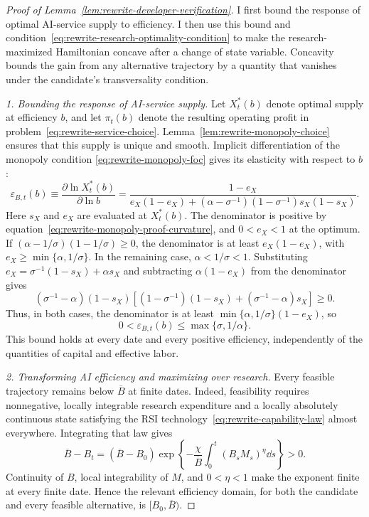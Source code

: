 \begin{proof}[Proof of Lemma~\ref{lem:rewrite-developer-verification}]
I first bound the response of optimal AI-service supply to efficiency.
I then use this bound and
condition~\eqref{eq:rewrite-research-optimality-condition} to make the
research-maximized Hamiltonian concave after a change of state variable.
Concavity bounds the gain from any alternative trajectory by a quantity
that vanishes under the candidate's transversality condition.

\emph{1. Bounding the response of AI-service supply.}
Let $X_t^*(b)$ denote optimal supply at efficiency $b$, and let
$\pi_t(b)$ denote the resulting operating profit in
problem~\eqref{eq:rewrite-service-choice}.
Lemma~\ref{lem:rewrite-monopoly-choice} ensures that this supply is unique
and smooth. Implicit differentiation of the monopoly condition
\eqref{eq:rewrite-monopoly-foc} gives its elasticity with respect to $b$:
\begin{equation}
 \varepsilon_{B,t}(b)\equiv
 \frac{\partial\ln X_t^*(b)}{\partial\ln b}
 =\frac{1-e_X}{e_X(1-e_X)
 +(\alpha-\sigma^{-1})(1-\sigma^{-1})s_X(1-s_X)}.
 \label{eq:rewrite-service-capability-elasticity}
\end{equation}
Here $s_X$ and $e_X$ are evaluated at $X_t^*(b)$.
The denominator is positive by
equation~\eqref{eq:rewrite-monopoly-proof-curvature}, and $0<e_X<1$ at
the optimum. If $(\alpha-1/\sigma)(1-1/\sigma)\geq0$, the denominator
is at least $e_X(1-e_X)$, with
$e_X\geq\min\{\alpha,1/\sigma\}$.
In the remaining case, $\alpha<1/\sigma<1$. Substituting
$e_X=\sigma^{-1}(1-s_X)+\alpha s_X$ and subtracting
$\alpha(1-e_X)$ from the denominator gives
\[
 (\sigma^{-1}-\alpha)(1-s_X)
 \left[(1-\sigma^{-1})(1-s_X)+(\sigma^{-1}-\alpha)s_X\right]\geq0.
\]
Thus, in both cases, the denominator is at least
$\min\{\alpha,1/\sigma\}(1-e_X)$, so
\begin{equation}
 0<\varepsilon_{B,t}(b)\leq\max\{\sigma,1/\alpha\}.
 \label{eq:rewrite-service-elasticity-bound}
\end{equation}
This bound holds at every date and every positive efficiency, independently
of the quantities of capital and effective labor.

\emph{2. Transforming AI efficiency and maximizing over research.}
Every feasible trajectory remains below $\overline B$ at finite dates.
Indeed, feasibility requires nonnegative, locally integrable research
expenditure and a locally absolutely continuous state satisfying the
RSI technology~\eqref{eq:rewrite-capability-law} almost everywhere.
Integrating that law gives
\begin{equation}
 \overline B-B_t=(\overline B-B_0)
 \exp\left\{-\frac{\chi}{\overline B}
 \int_0^t(B_sM_s)^\eta\dd s\right\}>0.
 \label{eq:rewrite-cap-gap}
\end{equation}
Continuity of $B$, local integrability of $M$, and $0<\eta<1$ make the
exponent finite at every finite date. Hence the relevant efficiency domain,
for both the candidate and every feasible alternative, is $[B_0,\overline B)$.


\end{proof}
